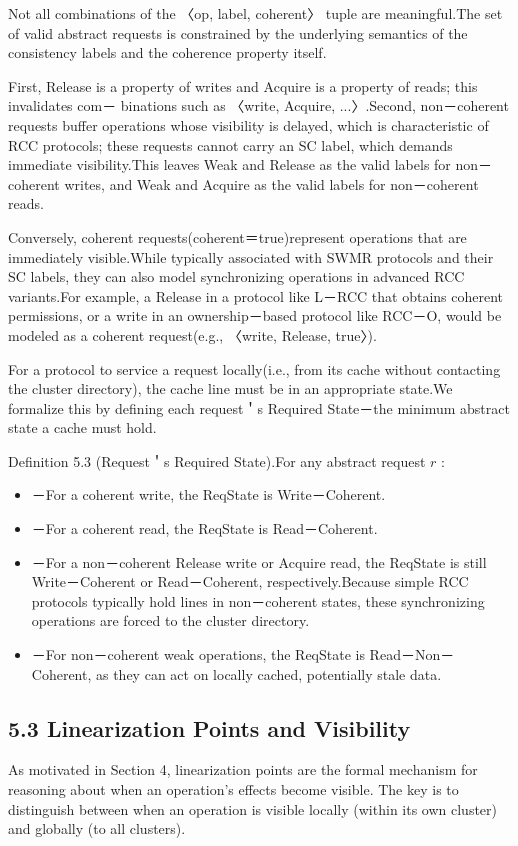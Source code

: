 \documentclass[10pt]{article}
\begin{document}
Not all combinations of the 〈op, label, coherent〉 tuple are meaningful.The set of valid abstract requests is constrained by the underlying semantics of the consistency labels and the coherence property itself.

First, Release is a property of writes and Acquire is a property of reads; this invalidates com－ binations such as 〈write, Acquire, ...〉.Second, non－coherent requests buffer operations whose visibility is delayed, which is characteristic of RCC protocols; these requests cannot carry an SC label, which demands immediate visibility.This leaves Weak and Release as the valid labels for non－coherent writes, and Weak and Acquire as the valid labels for non－coherent reads.

Conversely, coherent requests(coherent＝true)represent operations that are immediately visible.While typically associated with SWMR protocols and their SC labels, they can also model synchronizing operations in advanced RCC variants.For example, a Release in a protocol like L－RCC that obtains coherent permissions, or a write in an ownership－based protocol like RCC－O,  would be modeled as a coherent request(e.g., 〈write, Release, true〉).

For a protocol to service a request locally(i.e., from its cache without contacting the cluster directory), the cache line must be in an appropriate state.We formalize this by defining each request＇s Required State－the minimum abstract state a cache must hold.

Definition 5.3 (Request＇s Required State).For any abstract request $r$ : 

\begin{itemize}
  \item[] －For a coherent write, the ReqState is Write－Coherent.
  \item[] －For a coherent read, the ReqState is Read－Coherent.
  \item[] －For a non－coherent Release write or Acquire read, the ReqState is still Write－Coherent or Read－Coherent, respectively.Because simple RCC protocols typically hold lines in non－coherent states, these synchronizing operations are forced to the cluster directory.
  \item[] －For non－coherent weak operations, the ReqState is Read－Non－Coherent, as they can act on locally cached, potentially stale data.
\end{itemize}

\subsection*{5.3 Linearization Points and Visibility}
As motivated in Section 4, linearization points are the formal mechanism for reasoning about when an operation's effects become visible. The key is to distinguish between when an operation is visible locally (within its own cluster) and globally (to all clusters).
\end{document}
